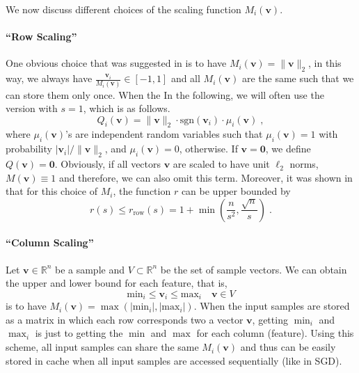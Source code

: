\documentclass{article}
\newcommand{\R}{\mathbb{R}}
\newcommand{\sgn}[1]{\mbox{sgn}(#1)}
\renewcommand{\vec}[1]{\mathbf{#1}}
\def\rrow{r_\mathrm{row}}
\begin{document}
We now discuss different choices of the scaling function $M_i(\vec{v})$.

\paragraph*{``Row Scaling''}

One obvious choice that was suggested in \cite{Alistarh:2016:ArXiv} is to have $M_i(\vec{v}) = \| \vec{v} \|_2$, in this way, we
always have $\frac{\vec{v}_i}{M_i(\vec{v})} \in [-1, 1]$ and all $M_i(\vec{v})$ are the same
such that we can store them only once.
When the 
In the following, we will often use the version with $s = 1$, which is as follows. 
\begin{equation}
\label{equ:quant1}
Q_i(\vec{v}) = \| \vec{v} \|_2 \cdot \sgn{\vec{v}_i} \cdot \mu_i (\vec{v}) \; ,
\end{equation}
where $\mu_i(\vec{v})$'s are independent random variables such that $\mu_i(\vec{v}) = 1$ with probability $|\vec{v}_i| / \| \vec{v} \|_2$, and $\mu_i(\vec{v}) = 0$, otherwise. If $\vec{v} = \vec{0}$, we define $Q(\vec{v}) = \vec{0}$. 
%
Obviously, if
all vectors $\vec{v}$ are scaled to have unit $\ell_2$ norms, $M(\vec{v}) \equiv 1$
and therefore, we can also omit this term.
Moreover, it was shown in \cite{Alistarh:2016:ArXiv} that for this choice of $M_i$, the function $r$ can be upper bounded by
\[
r(s) \leq \rrow (s) = 1 + \min\left( \frac{n}{s^2}, \frac{\sqrt{n}}{s} \right) \; .
\]

\paragraph*{``Column Scaling''}
Let $\vec{v} \in \R^n$ be a sample and $V \subset \R^n$ be the set of sample vectors. 
We can obtain the upper and lower bound for each feature, that is,
\[
\text{min}_i \le \vec{v}_i \le  \text{max}_i\quad \vec{v} \in V
\]
is to have $M_i(\vec{v}) = \max(|\text{min}_i|, |\text{max}_i|)$.
When the input samples are stored as a matrix in which each row corresponds
two a vector $\vec{v}$, getting $\min_i$ and $\max_i$
is just to getting
the $\min$ and $\max$ for each column (feature).
Using this scheme, all input samples can share the same
$M_i(\vec{v})$ and thus can be easily stored in cache when all
input samples are accessed sequentially (like in SGD).
\end{document}
